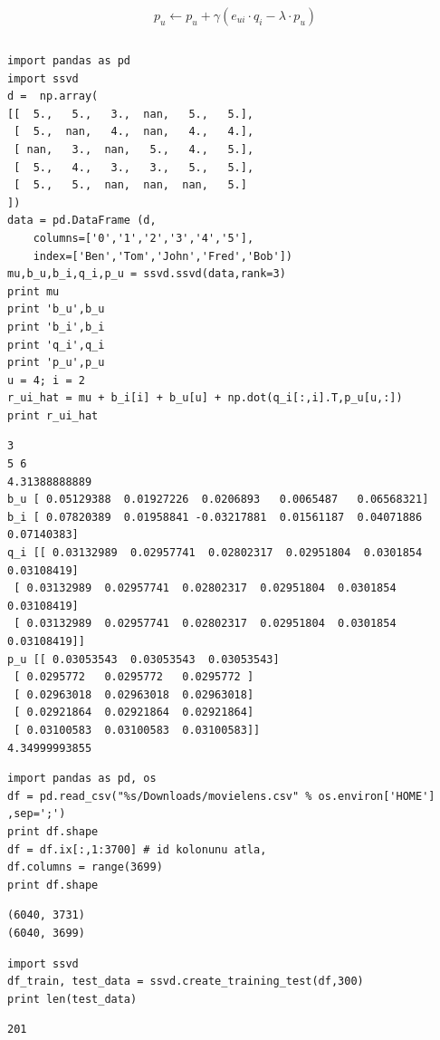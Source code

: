 \documentclass[12pt,fleqn]{article}\usepackage{../common}
\begin{document}
$$
p_u \leftarrow p_u + \gamma (e_{ui}\cdot q_i - \lambda \cdot p_u)
$$


\inputminted[fontsize=\footnotesize]{python}{ssvd.py}

\begin{verbatim}
import pandas as pd
import ssvd
d =  np.array(
[[  5.,   5.,   3.,  nan,   5.,   5.],
 [  5.,  nan,   4.,  nan,   4.,   4.],
 [ nan,   3.,  nan,   5.,   4.,   5.],
 [  5.,   4.,   3.,   3.,   5.,   5.],
 [  5.,   5.,  nan,  nan,  nan,   5.]
])
data = pd.DataFrame (d,
    columns=['0','1','2','3','4','5'],
    index=['Ben','Tom','John','Fred','Bob'])
mu,b_u,b_i,q_i,p_u = ssvd.ssvd(data,rank=3)
print mu
print 'b_u',b_u
print 'b_i',b_i
print 'q_i',q_i
print 'p_u',p_u
u = 4; i = 2
r_ui_hat = mu + b_i[i] + b_u[u] + np.dot(q_i[:,i].T,p_u[u,:])
print r_ui_hat
\end{verbatim}

\begin{verbatim}
3
5 6
4.31388888889
b_u [ 0.05129388  0.01927226  0.0206893   0.0065487   0.06568321]
b_i [ 0.07820389  0.01958841 -0.03217881  0.01561187  0.04071886  0.07140383]
q_i [[ 0.03132989  0.02957741  0.02802317  0.02951804  0.0301854   0.03108419]
 [ 0.03132989  0.02957741  0.02802317  0.02951804  0.0301854   0.03108419]
 [ 0.03132989  0.02957741  0.02802317  0.02951804  0.0301854   0.03108419]]
p_u [[ 0.03053543  0.03053543  0.03053543]
 [ 0.0295772   0.0295772   0.0295772 ]
 [ 0.02963018  0.02963018  0.02963018]
 [ 0.02921864  0.02921864  0.02921864]
 [ 0.03100583  0.03100583  0.03100583]]
4.34999993855
\end{verbatim}


\begin{verbatim}
import pandas as pd, os
df = pd.read_csv("%s/Downloads/movielens.csv" % os.environ['HOME'] ,sep=';')
print df.shape
df = df.ix[:,1:3700] # id kolonunu atla,
df.columns = range(3699)
print df.shape
\end{verbatim}

\begin{verbatim}
(6040, 3731)
(6040, 3699)
\end{verbatim}

\begin{verbatim}
import ssvd
df_train, test_data = ssvd.create_training_test(df,300)
print len(test_data)
\end{verbatim}

\begin{verbatim}
201
\end{verbatim}
\end{document}
